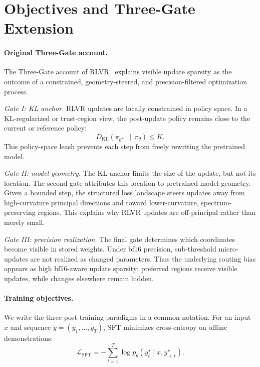 \documentclass{llmxive}
\begin{document}
\section{Objectives and Three-Gate Extension}
\label{app:three_gate_extension}

\paragraph{Original Three-Gate account.}
The Three-Gate account of RLVR~\cite{zhu2025pnt} explains visible update
sparsity as the outcome of a constrained, geometry-steered, and
precision-filtered optimization process.

\emph{Gate I: KL anchor.}
RLVR updates are locally constrained in policy space. In a KL-regularized or
trust-region view, the post-update policy remains close to the current or
reference policy:
\begin{equation}
D_{\mathrm{KL}}(\pi_{\theta^+}\,\|\,\pi_{\theta})
\leq K .
\end{equation}
This policy-space leash prevents each step from freely rewriting the
pretrained model.

\emph{Gate II: model geometry.}
The KL anchor limits the size of the update, but not its location. The second
gate attributes this location to pretrained model geometry. Given a bounded
step, the structured loss landscape steers updates away from high-curvature
principal directions and toward lower-curvature, spectrum-preserving regions.
This explains why RLVR updates are off-principal rather than merely small.

\emph{Gate III: precision realization.}
The final gate determines which coordinates become visible in stored weights.
Under bf16 precision, sub-threshold micro-updates are not realized as changed
parameters. Thus the underlying routing bias appears as high bf16-aware update
sparsity: preferred regions receive visible updates, while changes elsewhere
remain hidden.


\paragraph{Training objectives.}
We write the three post-training paradigms in a common notation. For an input
$x$ and sequence $y=(y_1,\ldots,y_T)$, SFT minimizes cross-entropy on offline
demonstrations:
\begin{equation}
\mathcal{L}_{\mathrm{SFT}}
=
-\sum_{t=1}^{T}
\log p_\theta(y_t^\star\mid x,y_{<t}^\star).
\end{equation}
\end{document}
